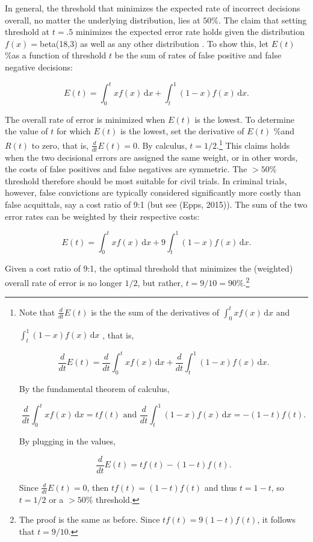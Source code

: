 \documentclass[
  10pt,
  dvipsnames,enabledeprecatedfontcommands]{scrartcl}
\begin{document}
In general, the threshold that minimizes the expected rate of incorrect
decisions overall, no matter the underlying distribution, lies at
\(50\%\). The claim that setting threshold at \(t=.5\) minimizes the
expected error rate holds given the distribution \(f(x)=\)beta(18,3) as
well as any other distribution
\citep{kaye1982limits, Kaye1999Clarifying-the-, cheng2015}. To show
this, let \(E(t)\) \%as a function of threshold \(t\) be the sum of
rates of false positive and false negative decisions:

\[E(t) = \int_0^t \! x f(x) \, \mathrm{d}x + \int_t^1 \! (1-x) f(x) \, \mathrm{d}x.
\]

The overall rate of error is minimized when \(E(t)\) is the lowest. To
determine the value of \(t\) for which \(E(t)\) is the lowest, set the
derivative of \(E(t)\) \%and \(R(t)\) to zero, that is,
\(\frac{d}{dt} E(t)= 0\). By calculus,
\(t=1/2\).\footnote{Note that $\frac{d}{dt}  E(t)$ is the the sum of the derivatives of $\int_0^t \! x f(x) \, \mathrm{d}x$ 
and 

$\int_t^1 \!(1-x) f(x) \, \mathrm{d}x$
, that is,

\[\frac{d}{dt} E(t) = \frac{d}{dt}  \int_0^t \! x f(x) \, \mathrm{d}x + \frac{d}{dt}  \int_t^1 \! (1-x) f(x) \, \mathrm{d}x.\]

By the fundamental theorem of calculus, 

\[\frac{d}{dt}   \int_0^t \! x f(x) \, \mathrm{d}x = tf(t) \text{ and }
\frac{d}{dt}   \int_t^1 \! (1-x) f(x) \, \mathrm{d}x = -(1-t)f(t). \]

By plugging in the values, 

\[\frac{d}{dt}  E(t) = tf(t)  -(1-t)f(t). \]

Since $\frac{d}{dt}  E(t)= 0$, then $tf(t)  = (1-t)f(t)$
and thus
$t  = 1-t$, so 
$t  = 1/2$ or a $>50\%$ threshold.
} This claims holds when the two decisional errors are assigned the same
weight, or in other words, the costs of false positives and false
negatives are symmetric. The \(>50\%\) threshold therefore should be
most suitable for civil trials. In criminal trials, however, false
convictions are typically considered significantly more costly than
false acquittals, say a cost ratio of 9:1 (but see (Epps, 2015)). The
sum of the two error rates can be weighted by their respective costs:

\[E(t) = \int_0^t \! x f(x) \, \mathrm{d}x + 9\int_t^1 \! (1-x) f(x) \, \mathrm{d}x.
\]

Given a cost ratio of 9:1, the optimal threshold that minimizes the
(weighted) overall rate of error is no longer \(1/2\), but rather,
\(t=9/10=90\%\).\footnote{The proof is the same as before. Since $tf(t)  = 9(1-t)f(t)$, it follows that 
$t  = 9/10$.}
\end{document}

